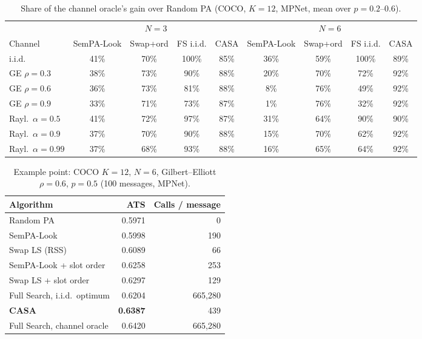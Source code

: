 \documentclass[journal,onecolumn,11pt,draftclsnofoot]{IEEEtran}
\begin{document}
\begin{table}[t]
\centering
\caption{Share of the channel oracle's gain over Random PA (COCO, $K=12$, MPNet, mean over $p=0.2$--$0.6$).}
\label{tab:share}
\begin{tabular}{lcccc@{\hskip 12pt}cccc}
\toprule
& \multicolumn{4}{c}{$N=3$} & \multicolumn{4}{c}{$N=6$}\\
Channel & SemPA-Look & Swap+ord & FS i.i.d. & CASA & SemPA-Look & Swap+ord & FS i.i.d. & CASA\\
\midrule
i.i.d. & 41\% & 70\% & 100\% & 85\% & 36\% & 59\% & 100\% & 89\%\\
GE $\rho=0.3$ & 38\% & 73\% & 90\% & 88\% & 20\% & 70\% & 72\% & 92\%\\
GE $\rho=0.6$ & 36\% & 73\% & 81\% & 88\% & 8\% & 76\% & 49\% & 92\%\\
GE $\rho=0.9$ & 33\% & 71\% & 73\% & 87\% & 1\% & 76\% & 32\% & 92\%\\
Rayl.\ $\alpha=0.5$ & 41\% & 72\% & 97\% & 87\% & 31\% & 64\% & 90\% & 90\%\\
Rayl.\ $\alpha=0.9$ & 37\% & 70\% & 90\% & 88\% & 15\% & 70\% & 62\% & 92\%\\
Rayl.\ $\alpha=0.99$ & 37\% & 68\% & 93\% & 88\% & 16\% & 65\% & 64\% & 92\%\\
\bottomrule
\end{tabular}
\end{table}

\begin{table}[t]
\centering
\caption{Example point: COCO $K=12$, $N=6$, Gilbert--Elliott $\rho=0.6$, $p=0.5$ (100 messages, MPNet).}
\label{tab:example}
\begin{tabular}{lrr}
\toprule
Algorithm & ATS & Calls / message\\
\midrule
Random PA & 0.5971 & 0\\
SemPA-Look & 0.5998 & 190\\
Swap LS (RSS) & 0.6089 & 66\\
SemPA-Look + slot order & 0.6258 & 253\\
Swap LS + slot order & 0.6297 & 129\\
Full Search, i.i.d.\ optimum & 0.6204 & 665{,}280\\
\textbf{CASA} & \textbf{0.6387} & 439\\
Full Search, channel oracle & 0.6420 & 665{,}280\\
\bottomrule
\end{tabular}
\end{table}
\end{document}
